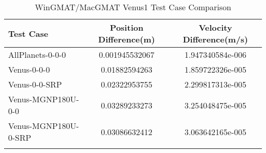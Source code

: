 \begin{table}[htbp!]
\centering
\caption{ WinGMAT/MacGMAT Venus1 Test Case Comparison}
      \begin{tabular}{lcc}
      \hline\hline
          Test Case & Position Difference(m) & Velocity Difference(m/s) \\
         \hline
         AllPlanets-0-0-0 & 0.001945532067 & 1.947340584e-006 \\
         Venus-0-0-0 & 0.01882594263 & 1.859722326e-005 \\
         Venus-0-0-SRP & 0.02322953755 & 2.299817313e-005 \\
         Venus-MGNP180U-0-0 & 0.03289233273 & 3.254048475e-005 \\
         Venus-MGNP180U-0-SRP & 0.03086632412 & 3.063642165e-005 \\
      \hline\hline
      \label{Table: Venus1 WinGMAT-MacGMAT Table} 
\end{tabular}
\end{table}
